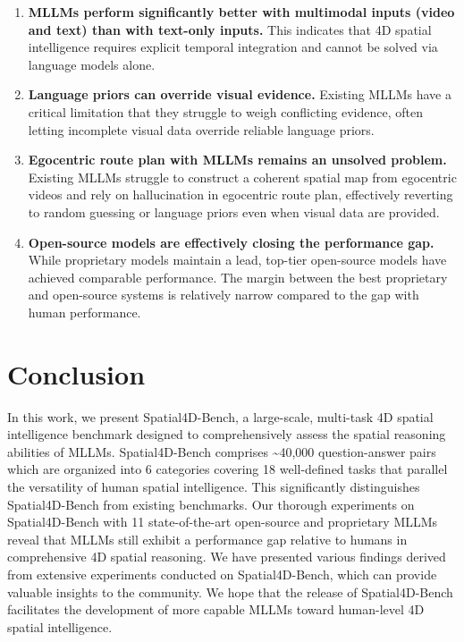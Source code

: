 \documentclass{article}
\begin{document}
\begin{enumerate}
  \item{
    \textbf{MLLMs perform significantly better with multimodal inputs (video and text) than with text-only inputs.}
    This indicates that 4D spatial intelligence requires explicit temporal integration and cannot be solved via language models alone.
  }
  \item{
   \textbf{Language priors can override visual evidence.} 
    Existing MLLMs have a critical limitation that they struggle to weigh conflicting evidence, often letting incomplete visual data override reliable language priors.
  }
  \item{
    \textbf{Egocentric route plan with MLLMs remains an unsolved problem.} 
    Existing MLLMs struggle to construct a coherent spatial map from egocentric videos and rely on hallucination in egocentric route plan, effectively reverting to random guessing or language priors even when visual data are provided.
  }
  \item{\textbf{Open-source models are effectively closing the performance gap.} 
    While proprietary models maintain a lead, top-tier open-source models have achieved comparable performance. The margin between the best proprietary and open-source systems is relatively narrow compared to the gap with human performance.
  }
\end{enumerate}







\section{Conclusion}
\label{conclusion}

In this work, we present Spatial4D-Bench, a large-scale, multi-task 4D spatial intelligence benchmark designed to comprehensively assess the spatial reasoning abilities of MLLMs.
Spatial4D-Bench comprises \textasciitilde40,000 question-answer pairs which are organized into 6 categories covering 18 well-defined tasks that parallel the versatility of human spatial intelligence. 
This significantly distinguishes Spatial4D-Bench from existing benchmarks.
Our thorough experiments on Spatial4D-Bench with 11 state-of-the-art open-source and proprietary MLLMs reveal that MLLMs still exhibit a performance gap relative to humans in comprehensive 4D spatial reasoning.
We have presented various findings derived from extensive experiments conducted on Spatial4D-Bench, which can provide valuable insights to the community.
We hope that the release of  Spatial4D-Bench facilitates the development of more capable MLLMs toward human-level 4D spatial intelligence.
\end{document}
